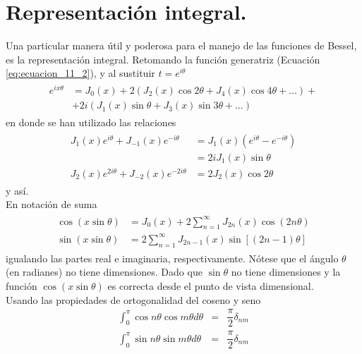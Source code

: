 \section{Representación integral.}
Una particular manera útil y poderosa para el manejo de las funciones de Bessel, es la representación integral. Retomando la función generatriz (Ecuación \ref{eq:ecuacion_11_2}), y al sustituir $t=e^{i\theta}$
\begin{eqnarray}
\begin{aligned}
e^{ix\theta} &= J_{0}(x) + 2 (J_{2}(x) \cos 2 \theta + J_{4}(x) \cos 4 \theta + \ldots) + \\
&+ 2i (J_{1}(x) \sin \theta + J_{3}(x) \sin 3 \theta + \ldots)
\end{aligned}
\label{eq:ecuacion_11_23}
\end{eqnarray}
en donde se han utilizado las relaciones
\begin{eqnarray}
\begin{aligned}
J_{1}(x) e^{i \theta} + J_{-1}(x) e^{-i \theta} &= J_{1} (x) (e^{i \theta} - e^{-i \theta}) \\
&= 2 i J_{1}(x) \sin \theta \\
J_{2}(x) e^{2i \theta} + J_{-2}(x) e^{-2 i \theta} &= 2 J_{2} (x)\cos 2 \theta
\end{aligned}
\label{eq:ecuacion_11_24}
\end{eqnarray}
y así.
\\
En notación de suma
\begin{eqnarray}
\begin{aligned}
\cos (x \sin \theta) &= J_{0}(x) + 2 \sum_{n=1}^{\infty} J_{2n}(x) \cos (2n \theta) \\
\sin (x \sin \theta) &=  2 \sum_{n=1}^{\infty} J_{2n-1} (x) \sin [(2n-1) \theta]
\end{aligned}
\label{eq:ecuacion_11_25}
\end{eqnarray}
igualando las partes real e imaginaria, respectivamente. Nótese que el ángulo $\theta$ (en radianes) no tiene dimensiones. Dado que $\sin \theta$ no tiene dimensiones y la función $\cos (x \sin \theta)$ es correcta desde el punto de vista dimensional.
\\
Usando las propiedades de ortogonalidad del coseno y seno
\begin{eqnarray}
\int_{0}^{\pi} \cos n \theta \cos m \theta d \theta &=& \dfrac{\pi}{2} \delta_{nm} \label{eq:ecuacion_11_26a} \\
\int_{0}^{\pi} \sin n \theta \sin m \theta d \theta &=& \dfrac{\pi}{2} \delta_{nm} \label{eq:ecuacion_11_26b}
\end{eqnarray}
